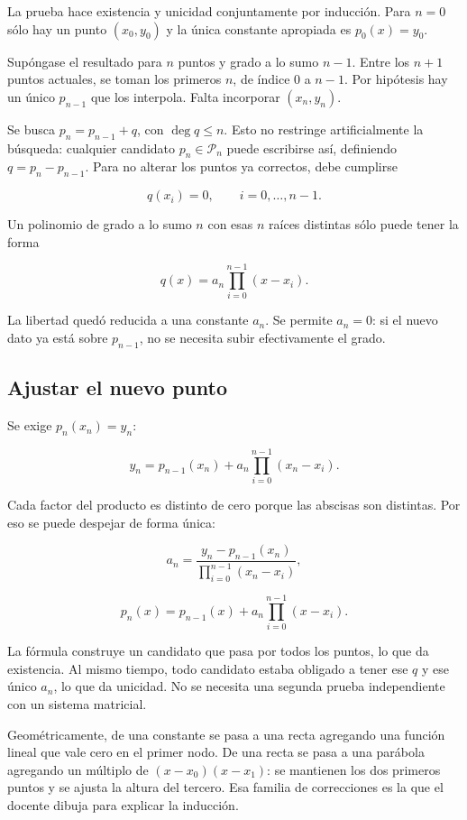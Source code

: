 \documentclass[12pt,a4paper]{article}
\begin{document}
La prueba hace existencia y unicidad conjuntamente por inducción. Para $n=0$ sólo hay un punto $(x_0,y_0)$ y la única constante apropiada es $p_0(x)=y_0$.

Supóngase el resultado para $n$ puntos y grado a lo sumo $n-1$. Entre los $n+1$ puntos actuales, se toman los primeros $n$, de índice 0 a $n-1$. Por hipótesis hay un único $p_{n-1}$ que los interpola. Falta incorporar $(x_n,y_n)$.

Se busca $p_n=p_{n-1}+q$, con $\deg q\le n$. Esto no restringe artificialmente la búsqueda: cualquier candidato $p_n\in\mathcal P_n$ puede escribirse así, definiendo $q=p_n-p_{n-1}$. Para no alterar los puntos ya correctos, debe cumplirse

\[
q(x_i)=0,\qquad i=0,\ldots,n-1.
\]

Un polinomio de grado a lo sumo $n$ con esas $n$ raíces distintas sólo puede tener la forma

\[
q(x)=a_n\prod_{i=0}^{n-1}(x-x_i).
\]

La libertad quedó reducida a una constante $a_n$. Se permite $a_n=0$: si el nuevo dato ya está sobre $p_{n-1}$, no se necesita subir efectivamente el grado.

\subsection{Ajustar el nuevo punto}

Se exige $p_n(x_n)=y_n$:

\[
y_n=p_{n-1}(x_n)+a_n\prod_{i=0}^{n-1}(x_n-x_i).
\]

Cada factor del producto es distinto de cero porque las abscisas son distintas. Por eso se puede despejar de forma única:

\[
\boxed{a_n=
\frac{y_n-p_{n-1}(x_n)}{\prod_{i=0}^{n-1}(x_n-x_i)}},
\]

\[
\boxed{p_n(x)=p_{n-1}(x)+a_n\prod_{i=0}^{n-1}(x-x_i)}.
\]

La fórmula construye un candidato que pasa por todos los puntos, lo que da existencia. Al mismo tiempo, todo candidato estaba obligado a tener ese $q$ y ese único $a_n$, lo que da unicidad. No se necesita una segunda prueba independiente con un sistema matricial.

Geométricamente, de una constante se pasa a una recta agregando una función lineal que vale cero en el primer nodo. De una recta se pasa a una parábola agregando un múltiplo de $(x-x_0)(x-x_1)$: se mantienen los dos primeros puntos y se ajusta la altura del tercero. Esa familia de correcciones es la que el docente dibuja para explicar la inducción.
\end{document}
